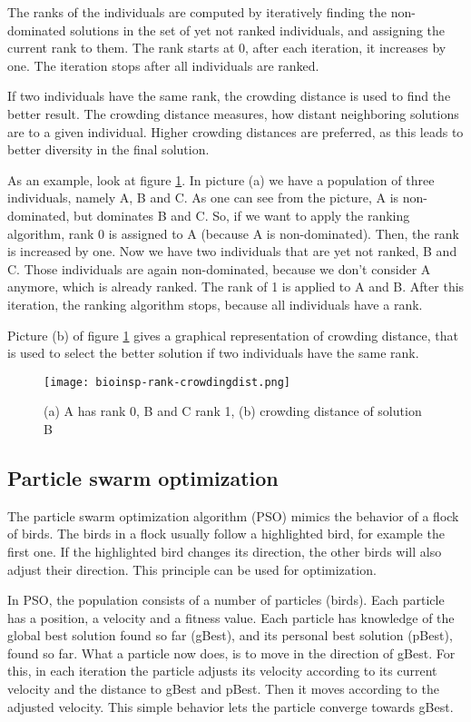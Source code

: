 The ranks of the individuals are computed by iteratively finding the non-dominated solutions in the set of yet not ranked individuals, and assigning the current rank to them. The rank starts at 0, after each iteration, it increases by one. The iteration stops after all individuals are ranked.

If two individuals have the same rank, the crowding distance is used to find the better result. The crowding distance measures, how distant neighboring solutions are to a given individual. Higher crowding distances are preferred, as this leads to better diversity in the final solution.

As an example, look at figure \ref{fig:rank-crowdingdist}. In picture (a) we have a population of three individuals, namely A, B and C. As one can see from the picture, A is non-dominated, but dominates B and C. So, if we want to apply the ranking algorithm, rank 0 is assigned to A (because A is non-dominated). Then, the rank is increased by one. Now we have two individuals that are yet not ranked, B and C. Those individuals are again non-dominated, because we don't consider A anymore, which is already ranked. The rank of 1 is applied to A and B. After this iteration, the ranking algorithm stops, because all individuals have a rank.

Picture (b) of figure \ref{fig:rank-crowdingdist} gives a graphical representation of crowding distance, that is used to select the better solution if two individuals have the same rank.

\begin{figure}[ht!]
  \centering
  \texttt{[image: bioinsp-rank-crowdingdist.png]}
  \caption{(a) A has rank 0, B and C rank 1, (b) crowding distance of solution B}
  \label{fig:rank-crowdingdist}
\end{figure}

\subsection{Particle swarm optimization}
The particle swarm optimization algorithm (PSO) mimics the behavior of a flock of birds. The birds in a flock usually follow a highlighted bird, for example the first one. If the highlighted bird changes its direction, the other birds will also adjust their direction. This principle can be used for optimization.

In PSO, the population consists of a number of particles (birds). Each particle has a position, a velocity and a fitness value. Each particle has knowledge of the global best solution found so far (gBest), and its personal best solution (pBest), found so far. What a particle now does, is to move in the direction of gBest. For this, in each iteration the particle adjusts its velocity according to its current velocity and the distance to gBest and pBest. Then it moves according to the adjusted velocity. This simple behavior lets the particle converge towards gBest.

